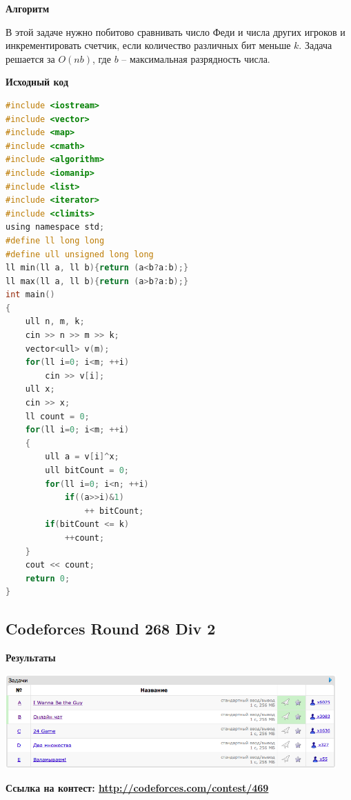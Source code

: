 \documentclass[a4paper,12pt]{article}
\begin{document}
\textbf{{\large Алгоритм}}

В этой задаче нужно побитово сравнивать число Феди и числа других игроков и инкрементировать счетчик, если количество различных бит меньше $k$. Задача решается за $O(nb)$, где $b$ -- максимальная разрядность числа.

\newpage
\textbf{{\large Исходный код}} \\
\begin{lstlisting}[language=C]
#include <iostream>
#include <vector>
#include <map>
#include <cmath>
#include <algorithm>
#include <iomanip>
#include <list>
#include <iterator>
#include <climits>
using namespace std;
#define ll long long
#define ull unsigned long long
ll min(ll a, ll b){return (a<b?a:b);}
ll max(ll a, ll b){return (a>b?a:b);}
int main()
{
    ull n, m, k;
    cin >> n >> m >> k;
    vector<ull> v(m);
    for(ll i=0; i<m; ++i)
        cin >> v[i];
    ull x;
    cin >> x;
    ll count = 0;
    for(ll i=0; i<m; ++i)
    {
        ull a = v[i]^x;
        ull bitCount = 0;
        for(ll i=0; i<n; ++i)
            if((a>>i)&1)
                ++ bitCount;
        if(bitCount <= k)
            ++count;
    }
    cout << count;
    return 0;
}
\end{lstlisting}


%
%

\newpage
\subsection{Codeforces Round 268 Div 2}


\textbf{{\large Результаты}} \\
\begin{center}
\includegraphics[width=0.95\textwidth]{C_268/A_C_268_result.png}\\ [1cm]
\end{center}

\textbf{{\large Ссылка на контест: \url{http://codeforces.com/contest/469}}}
\end{document}
